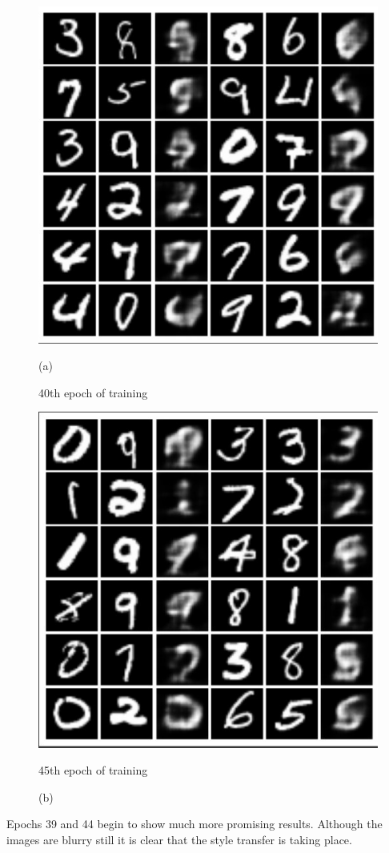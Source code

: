 \documentclass{article}
\begin{document}
\begin{figure}[hbt]
    \centering
    \begin{minipage}{.5\textwidth}
        \centering
        \includegraphics[width=.4\linewidth]{images/EXP7_39.jpg}
        \caption{(a)}{40th epoch of training}
        \label{fig:sub9}
    \end{minipage}%
    \begin{minipage}{.5\textwidth}
        \centering
        \includegraphics[width=.4\linewidth]{images/EXP7_44.jpg}
        \caption{(b)}{45th epoch of training}
        \label{fig:sub10}
    \end{minipage}
\end{figure}

Epochs 39 and 44 begin to show much more promising results. Although the images are blurry still
it is clear that the style transfer is taking place.
\end{document}
